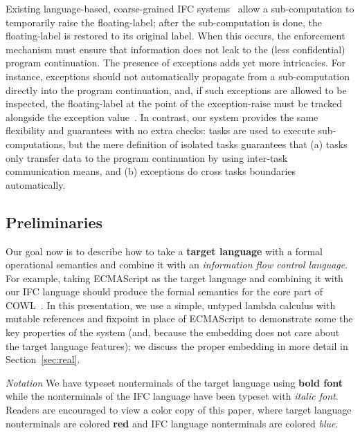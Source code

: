\documentclass{llncs}
\begin{document}
Existing language-based, coarse-grained IFC
systems~\cite{Hritcu:2013:YIB:2497621.2498098,stefan:2012:arxiv-flexible}
allow a sub-computation to temporarily raise the floating-label; after
the sub-computation is done, the floating-label is restored to its
original label. When this occurs, the enforcement mechanism must
ensure that information does not leak to the (less confidential)
program continuation. The presence of exceptions adds yet more
intricacies.  For instance, exceptions should not automatically
propagate from a sub-computation directly into the program
continuation, and, if such exceptions are allowed to be inspected, the
floating-label at the point of the exception-raise must be tracked
alongside the exception
value~\cite{Hritcu:2013:YIB:2497621.2498098,stefan:2012:arxiv-flexible,Hedin:2012}.
In contrast, our system
provides the same flexibility and guarantees with no extra checks: tasks
are used to execute sub-computations, but the mere definition of
isolated tasks guarantees that (a) tasks only transfer data to the
program continuation by using inter-task communication means, and (b)
exceptions do cross tasks boundaries automatically.


\subsection{Preliminaries}

Our goal now is to
describe how to take a \textbf{{\color{red} target
language}} with a formal operational semantics and combine it with an
\textit{{\color{blue} information flow control language}}.  For example,
taking ECMAScript as the target language and combining it with our IFC
language should produce the formal semantics for the core part of COWL~\cite{swapi}.  In this
presentation, we use a simple, untyped lambda calculus with mutable
references and fixpoint in place of ECMAScript to demonstrate some the key
properties of the system (and, because the embedding does not care
about the target language features); we discuss the proper embedding
in more detail in Section~\ref{sec:real}.

\vspace{1pt}
\noindent
\textit{Notation}
We have typeset nonterminals of the target language using \textbf{{\color{red}
bold font}} while the nonterminals of the IFC language have been typeset
with \textit{{\color{blue} italic font}}.  Readers are encouraged to view
a color copy of this paper, where target language nonterminals are colored \textbf{{\color{red} red}}
and IFC language nonterminals are colored \textit{{\color{blue} blue}}.
\end{document}

